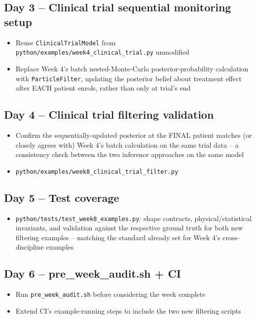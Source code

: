 \documentclass[11pt]{article}
\begin{document}
\subsection*{Day 3 -- Clinical trial sequential monitoring setup}
\begin{itemize}[leftmargin=*]
  \item Reuse \texttt{ClinicalTrialModel} from
    \texttt{python/examples/week4\_clinical\_trial.py} unmodified
  \item Replace Week 4's batch nested-Monte-Carlo posterior-probability
    calculation with \texttt{ParticleFilter}, updating the posterior
    belief about treatment effect after EACH patient enrols, rather
    than only at trial's end
\end{itemize}

\subsection*{Day 4 -- Clinical trial filtering validation}
\begin{itemize}[leftmargin=*]
  \item Confirm the sequentially-updated posterior at the FINAL patient
    matches (or closely agrees with) Week 4's batch calculation on the
    same trial data -- a consistency check between the two inference
    approaches on the same model
  \item \texttt{python/examples/week8\_clinical\_trial\_filter.py}
\end{itemize}

\subsection*{Day 5 -- Test coverage}
\begin{itemize}[leftmargin=*]
  \item \texttt{python/tests/test\_week8\_examples.py}: shape
    contracts, physical/statistical invariants, and validation against
    the respective ground truth for both new filtering examples --
    matching the standard already set for Week 4's cross-discipline
    examples
\end{itemize}

\subsection*{Day 6 -- pre\_week\_audit.sh + CI}
\begin{itemize}[leftmargin=*]
  \item Run \texttt{pre\_week\_audit.sh} before considering the week
    complete
  \item Extend CI's example-running steps to include the two new
    filtering scripts
\end{itemize}
\end{document}
